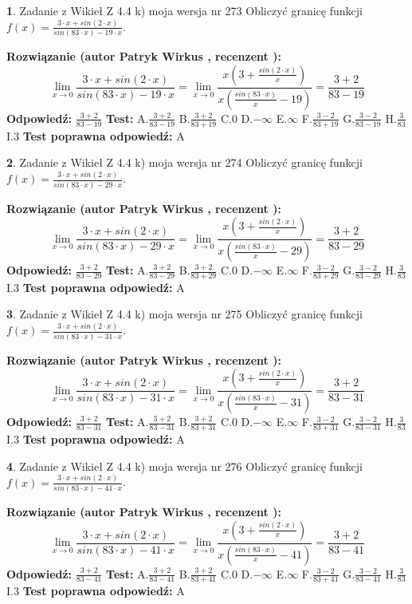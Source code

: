 \documentclass[12pt, a4paper]{article}
\theoremstyle{definition} %
\newtheorem{zad}{}
\newcommand{\zadStart}[1]{\begin{zad}#1\newline}
\newcommand{\zadStop}{\end{zad}}
\newcommand{\rozwStart}[2]{\noindent \textbf{Rozwiązanie (autor #1 , recenzent #2): }\newline}
\newcommand{\rozwStop}{\newline}
\newcommand{\odpStart}{\noindent \textbf{Odpowiedź:}\newline}
\newcommand{\odpStop}{\newline}
\newcommand{\testStart}{\noindent \textbf{Test:}\newline}
\newcommand{\testStop}{\newline}
\newcommand{\kluczStart}{\noindent \textbf{Test poprawna odpowiedź:}\newline}
\newcommand{\kluczStop}{\newline}
\begin{document}
\zadStart{Zadanie z Wikieł Z 4.4 k) moja wersja nr 273}
Obliczyć granicę funkcji $f(x)=\frac{3\cdot x +sin(2\cdot x)}{sin(83\cdot x) -19\cdot x}$.
\zadStop
\rozwStart{Patryk Wirkus}{}
$$\lim\limits_{x\to 0}\frac{3\cdot x +sin(2\cdot x)}{sin(83\cdot x) -19\cdot x}
=\lim\limits_{x\to 0}\frac{x(3+\frac{sin(2\cdot x)}{x})}{x(\frac{sin(83\cdot x)}{x}-19)}
=\frac{3+2}{83-19}$$
\rozwStop
\odpStart
$\frac{3+2}{83-19}$
\odpStop
\testStart
A.$\frac{3+2}{83-19}$
B.$\frac{3+2}{83+19}$
C.$0$
D.$-\infty$
E.$\infty$
F.$\frac{3-2}{83+19}$
G.$\frac{3-2}{83-19}$
H.$\frac{3}{83}$
I.$3$
\testStop
\kluczStart
A
\kluczStop



\zadStart{Zadanie z Wikieł Z 4.4 k) moja wersja nr 274}
Obliczyć granicę funkcji $f(x)=\frac{3\cdot x +sin(2\cdot x)}{sin(83\cdot x) -29\cdot x}$.
\zadStop
\rozwStart{Patryk Wirkus}{}
$$\lim\limits_{x\to 0}\frac{3\cdot x +sin(2\cdot x)}{sin(83\cdot x) -29\cdot x}
=\lim\limits_{x\to 0}\frac{x(3+\frac{sin(2\cdot x)}{x})}{x(\frac{sin(83\cdot x)}{x}-29)}
=\frac{3+2}{83-29}$$
\rozwStop
\odpStart
$\frac{3+2}{83-29}$
\odpStop
\testStart
A.$\frac{3+2}{83-29}$
B.$\frac{3+2}{83+29}$
C.$0$
D.$-\infty$
E.$\infty$
F.$\frac{3-2}{83+29}$
G.$\frac{3-2}{83-29}$
H.$\frac{3}{83}$
I.$3$
\testStop
\kluczStart
A
\kluczStop



\zadStart{Zadanie z Wikieł Z 4.4 k) moja wersja nr 275}
Obliczyć granicę funkcji $f(x)=\frac{3\cdot x +sin(2\cdot x)}{sin(83\cdot x) -31\cdot x}$.
\zadStop
\rozwStart{Patryk Wirkus}{}
$$\lim\limits_{x\to 0}\frac{3\cdot x +sin(2\cdot x)}{sin(83\cdot x) -31\cdot x}
=\lim\limits_{x\to 0}\frac{x(3+\frac{sin(2\cdot x)}{x})}{x(\frac{sin(83\cdot x)}{x}-31)}
=\frac{3+2}{83-31}$$
\rozwStop
\odpStart
$\frac{3+2}{83-31}$
\odpStop
\testStart
A.$\frac{3+2}{83-31}$
B.$\frac{3+2}{83+31}$
C.$0$
D.$-\infty$
E.$\infty$
F.$\frac{3-2}{83+31}$
G.$\frac{3-2}{83-31}$
H.$\frac{3}{83}$
I.$3$
\testStop
\kluczStart
A
\kluczStop



\zadStart{Zadanie z Wikieł Z 4.4 k) moja wersja nr 276}
Obliczyć granicę funkcji $f(x)=\frac{3\cdot x +sin(2\cdot x)}{sin(83\cdot x) -41\cdot x}$.
\zadStop
\rozwStart{Patryk Wirkus}{}
$$\lim\limits_{x\to 0}\frac{3\cdot x +sin(2\cdot x)}{sin(83\cdot x) -41\cdot x}
=\lim\limits_{x\to 0}\frac{x(3+\frac{sin(2\cdot x)}{x})}{x(\frac{sin(83\cdot x)}{x}-41)}
=\frac{3+2}{83-41}$$
\rozwStop
\odpStart
$\frac{3+2}{83-41}$
\odpStop
\testStart
A.$\frac{3+2}{83-41}$
B.$\frac{3+2}{83+41}$
C.$0$
D.$-\infty$
E.$\infty$
F.$\frac{3-2}{83+41}$
G.$\frac{3-2}{83-41}$
H.$\frac{3}{83}$
I.$3$
\testStop
\kluczStart
A
\kluczStop
\end{document}
